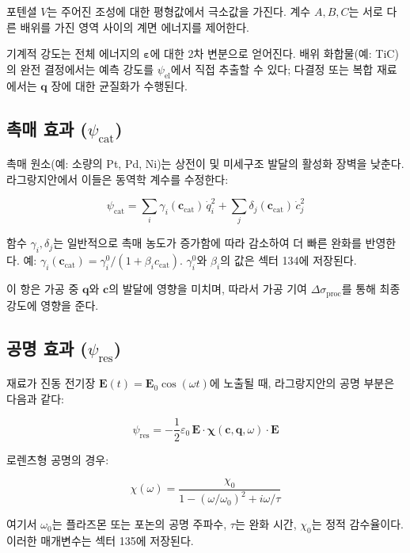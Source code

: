 \documentclass[12pt,a4paper]{article}
\begin{document}
	포텐셜 \(V\)는 주어진 조성에 대한 평형값에서 극소값을 가진다. 계수 \(A,B,C\)는 서로 다른 배위를 가진 영역 사이의 계면 에너지를 제어한다.
	
	기계적 강도는 전체 에너지의 \(\boldsymbol{\varepsilon}\)에 대한 2차 변분으로 얻어진다. 배위 화합물(예: TiC)의 완전 결정에서는 예측 강도를 \(\psi_{\mathrm{el}}\)에서 직접 추출할 수 있다; 다결정 또는 복합 재료에서는 \(\mathbf{q}\) 장에 대한 균질화가 수행된다.
	
	\subsection{촉매 효과 (\(\psi_{\mathrm{cat}}\))}
	\label{subsec:catalysis}
	
	촉매 원소(예: 소량의 Pt, Pd, Ni)는 상전이 및 미세구조 발달의 활성화 장벽을 낮춘다. 라그랑지안에서 이들은 동역학 계수를 수정한다:
	
	\[
	\psi_{\mathrm{cat}} = \sum_i \gamma_i(\mathbf{c}_{\mathrm{cat}})\, \dot{q}_i^2 + \sum_j \delta_j(\mathbf{c}_{\mathrm{cat}})\, \dot{c}_j^2
	\]
	
	함수 \(\gamma_i, \delta_j\)는 일반적으로 촉매 농도가 증가함에 따라 감소하여 더 빠른 완화를 반영한다. 예: \(\gamma_i(\mathbf{c}_{\mathrm{cat}}) = \gamma_i^0 / (1 + \beta_i c_{\mathrm{cat}})\). \(\gamma_i^0\)와 \(\beta_i\)의 값은 섹터 134에 저장된다.
	
	이 항은 가공 중 \(\mathbf{q}\)와 \(\mathbf{c}\)의 발달에 영향을 미치며, 따라서 가공 기여 \(\Delta\sigma_{\mathrm{proc}}\)를 통해 최종 강도에 영향을 준다.
	
	\subsection{공명 효과 (\(\psi_{\mathrm{res}}\))}
	\label{subsec:resonance}
	
	재료가 진동 전기장 \(\mathbf{E}(t) = \mathbf{E}_0 \cos(\omega t)\)에 노출될 때, 라그랑지안의 공명 부분은 다음과 같다:
	
	\[
	\psi_{\mathrm{res}} = -\frac{1}{2}\varepsilon_0\, \mathbf{E} \cdot \boldsymbol{\chi}(\mathbf{c}, \mathbf{q}, \omega) \cdot \mathbf{E}
	\]
	
	로렌츠형 공명의 경우:
	
	\[
	\chi(\omega) = \frac{\chi_0}{1 - (\omega/\omega_0)^2 + i\omega/\tau}
	\]
	
	여기서 \(\omega_0\)는 플라즈몬 또는 포논의 공명 주파수, \(\tau\)는 완화 시간, \(\chi_0\)는 정적 감수율이다. 이러한 매개변수는 섹터 135에 저장된다.
	
\end{document}

